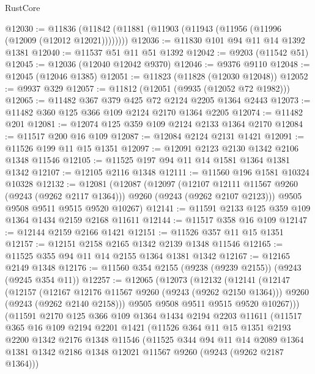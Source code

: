 \begin{lexlean}{RustCore}
\begin{coremodule}
@12030 := @11836 (@11842 (@11881 (@11903 (@11943 (@11956 (@11996 (@12009 (@12012 @12021))))))))
@12036 := @11830 @101 @94 @11 @14 @1392 @1381
@12040 := @11537 @51 @11 @51 @1392
@12042 := @9203 (@11542 @51)
@12045 := @12036 (@12040 @12042 @9370)
@12046 := @9376 @9110
@12048 := @12045 (@12046 @1385)
@12051 := @11823 (@11828 (@12030 @12048))
@12052 := @9937 @329
@12057 := @11812 (@12051 (@9935 (@12052 @72 @1982)))
@12065 := @11482 @367 @379 @425 @72 @2124 @2205 @1364 @2443
@12073 := @11482 @360 @125 @366 @109 @2124 @2170 @1364 @2205
@12074 := @11482 @201
@12081 := @12074 @125 @359 @109 @2124 @2133 @1364 @2170
@12084 := @11517 @200 @16 @109
@12087 := @12084 @2124 @2131 @1421
@12091 := @11526 @199 @11 @15 @1351
@12097 := @12091 @2123 @2130 @1342 @2106 @1348 @11546
@12105 := @11525 @197 @94 @11 @14 @1581 @1364 @1381 @1342
@12107 := @12105 @2116 @1348
@12111 := @11560 @196 @1581 @10324 @10328
@12132 := @12081
    (@12087
      (@12097
        (@12107 @12111 @11567 @9260 (@9243 (@9262 @2117 @1364)))
        @9260
        (@9243 (@9262 @2107 @2123)))
      @9505
      @9508
      @9511
      @9515
      @9520
      @10267)
@12141 := @11591 @2133 @125 @359 @109 @1364 @1434 @2159 @2168 @11611
@12144 := @11517 @358 @16 @109
@12147 := @12144 @2159 @2166 @1421
@12151 := @11526 @357 @11 @15 @1351
@12157 := @12151 @2158 @2165 @1342 @2139 @1348 @11546
@12165 := @11525 @355 @94 @11 @14 @2155 @1364 @1381 @1342
@12167 := @12165 @2149 @1348
@12176 := @11560 @354 @2155 (@9238 (@9239 @2155)) (@9243 (@9245 @354 @11))
@12257 := @12065
    (@12073
      (@12132
        (@12141
          (@12147
            (@12157
              (@12167 @12176 @11567 @9260 (@9243 (@9262 @2150 @1364)))
              @9260
              (@9243 (@9262 @2140 @2158)))
            @9505
            @9508
            @9511
            @9515
            @9520
            @10267)))
      (@11591
        @2170
        @125
        @366
        @109
        @1364
        @1434
        @2194
        @2203
        @11611
        (@11517
          @365
          @16
          @109
          @2194
          @2201
          @1421
          (@11526
            @364
            @11
            @15
            @1351
            @2193
            @2200
            @1342
            @2176
            @1348
            @11546
            (@11525
              @344
              @94
              @11
              @14
              @2089
              @1364
              @1381
              @1342
              @2186
              @1348
              @12021
              @11567
              @9260
              (@9243 (@9262 @2187 @1364)))

\end{coremodule}
\end{lexlean}

